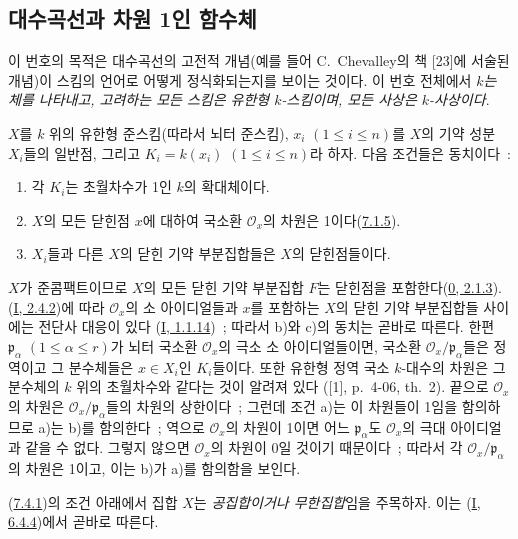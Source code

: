 \subsection{대수곡선과 차원 1인 함수체}
\label{subsection:II.7.4-ko}

이 번호의 목적은 대수곡선의 고전적 개념(예를 들어 C.~Chevalley의 책
[23]에 서술된 개념)이 스킴의 언어로 어떻게 정식화되는지를 보이는
것이다. 이 번호 전체에서 \emph{$k$는 체를 나타내고, 고려하는 모든
스킴은 유한형 $k$-스킴이며, 모든 사상은 $k$-사상이다}.

\begin{proposition}[7.4.1]
\label{II.7.4.1-ko}
$X$를 $k$ 위의 유한형 준스킴(따라서 뇌터 준스킴), $x_i$
$(1\leq i\leq n)$를 $X$의 기약 성분 $X_i$들의 일반점, 그리고
$K_i=k(x_i)$ $(1\leq i\leq n)$라 하자. 다음 조건들은 동치이다~:
\begin{enumerate}
\item[\rm a)] 각 $K_i$는 초월차수가 1인 $k$의 확대체이다.
\item[\rm b)] $X$의 모든 닫힌점 $x$에 대하여 국소환
$\mathcal{O}_x$의 차원은 1이다(\hyperref[II.7.1.5-ko]{7.1.5}).
\item[\rm c)] $X_i$들과 다른 $X$의 닫힌 기약 부분집합들은
$X$의 닫힌점들이다.
\end{enumerate}
\end{proposition}

$X$가 준콤팩트이므로 $X$의 모든 닫힌 기약 부분집합 $F$는 닫힌점을
포함한다(\hyperref[0.2.1.3-ko]{0, 2.1.3}).
(\hyperref[I.2.4.2-ko]{I, 2.4.2})에 따라 $\mathcal{O}_x$의 소 아이디얼들과
$x$를 포함하는 $X$의 닫힌 기약 부분집합들 사이에는 전단사 대응이 있다
(\hyperref[I.1.1.14-ko]{I, 1.1.14})~; 따라서 b)와 c)의 동치는 곧바로
따른다. 한편 $\mathfrak{p}_\alpha$ $(1\leq\alpha\leq r)$가 뇌터 국소환
$\mathcal{O}_x$의 극소 소 아이디얼들이면, 국소환
$\mathcal{O}_x/\mathfrak{p}_\alpha$들은 정역이고 그 분수체들은
$x\in X_i$인 $K_i$들이다. 또한 유한형 정역 국소 $k$-대수의 차원은 그
분수체의 $k$ 위의 초월차수와 같다는 것이 알려져 있다
([1], p.~4-06, th.~2). 끝으로 $\mathcal{O}_x$의 차원은
$\mathcal{O}_x/\mathfrak{p}_\alpha$들의 차원의 상한이다~; 그런데 조건
a)는 이 차원들이 1임을 함의하므로 a)는 b)를 함의한다~; 역으로
$\mathcal{O}_x$의 차원이 1이면 어느 $\mathfrak{p}_\alpha$도
$\mathcal{O}_x$의 극대 아이디얼과 같을 수 없다. 그렇지 않으면
$\mathcal{O}_x$의 차원이 0일 것이기 때문이다~; 따라서 각
$\mathcal{O}_x/\mathfrak{p}_\alpha$의 차원은 1이고, 이는 b)가 a)를
함의함을 보인다.

(\hyperref[II.7.4.1-ko]{7.4.1})의 조건 아래에서 집합 $X$는
\emph{공집합이거나 무한집합}임을 주목하자. 이는
(\hyperref[I.6.4.4-ko]{I, 6.4.4})에서 곧바로 따른다.

